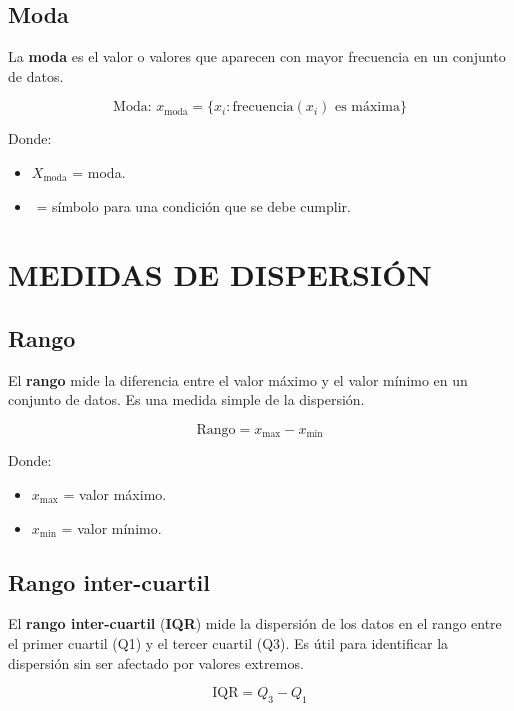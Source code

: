 \documentclass[
  letterpaper,
  DIV=11,
  numbers=noendperiod]{scrreprt}
\providecommand{\tightlist}{%
  \setlength{\itemsep}{0pt}\setlength{\parskip}{0pt}}
\begin{document}
\subsection{Moda}\label{moda}

La \textbf{moda} es el valor o valores que aparecen con mayor frecuencia
en un conjunto de datos.

\[
\text{Moda: } x_{\text{moda}} = \{x_i: \text{frecuencia}(x_i) \text{ es máxima}\}
\]

Donde:

\begin{itemize}
\tightlist
\item
  \(X_{\text{moda}}\) = moda.
\item
  \(\text{{}}\) = símbolo para una condición que se debe cumplir.
\end{itemize}

\section{MEDIDAS DE DISPERSIÓN}\label{medidas-de-dispersiuxf3n}

\subsection{Rango}\label{rango}

El \textbf{rango} mide la diferencia entre el valor máximo y el valor
mínimo en un conjunto de datos. Es una medida simple de la dispersión.

\[
\text{Rango} = x_{\text{max}} - x_{\text{min}}
\]

Donde:

\begin{itemize}
\tightlist
\item
  \(x_{\text{max}}\) = valor máximo.
\item
  \(x_{\text{min}}\) = valor mínimo.
\end{itemize}

\subsection{Rango inter-cuartil}\label{rango-inter-cuartil}

El \textbf{rango inter-cuartil} (\textbf{IQR}) mide la dispersión de los
datos en el rango entre el primer cuartil (Q1) y el tercer cuartil (Q3).
Es útil para identificar la dispersión sin ser afectado por valores
extremos.

\[
\text{IQR} = Q_{3} - Q_{1}
\]
\end{document}
